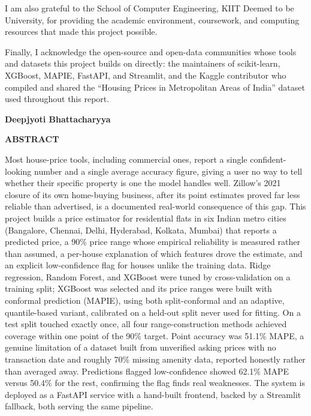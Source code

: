 \documentclass[12pt]{report}
\begin{document}
I am also grateful to the School of Computer Engineering, KIIT Deemed to be
University, for providing the academic environment, coursework, and computing
resources that made this project possible.

Finally, I acknowledge the open-source and open-data communities whose tools
and datasets this project builds on directly: the maintainers of scikit-learn,
XGBoost, MAPIE, FastAPI, and Streamlit, and the Kaggle contributor who
compiled and shared the ``Housing Prices in Metropolitan Areas of India''
dataset used throughout this report.

\vspace{2cm}
\noindent
\textbf{Deepjyoti Bhattacharyya}

\newpage
\thispagestyle{fancy}
\begin{center}
{\large \textbf{ABSTRACT}}
\end{center}
\vspace{0.6cm}

Most house-price tools, including commercial ones, report a single confident-looking
number and a single average accuracy figure, giving a user no way to tell whether
their specific property is one the model handles well. Zillow's 2021 closure of its
own home-buying business, after its point estimates proved far less reliable than
advertised, is a documented real-world consequence of this gap. This project builds a
price estimator for residential flats in six Indian metro cities (Bangalore, Chennai,
Delhi, Hyderabad, Kolkata, Mumbai) that reports a predicted price, a 90\% price range
whose empirical reliability is measured rather than assumed, a per-house explanation
of which features drove the estimate, and an explicit low-confidence flag for houses
unlike the training data. Ridge regression, Random Forest, and XGBoost were tuned by
cross-validation on a training split; XGBoost was selected and its price ranges were
built with conformal prediction (MAPIE), using both split-conformal and an adaptive,
quantile-based variant, calibrated on a held-out split never used for fitting. On a
test split touched exactly once, all four range-construction methods achieved
coverage within one point of the 90\% target. Point accuracy was 51.1\% MAPE, a
genuine limitation of a dataset built from unverified asking prices with no
transaction date and roughly 70\% missing amenity data, reported honestly rather than
averaged away. Predictions flagged low-confidence showed 62.1\% MAPE versus
50.4\% for the rest, confirming the flag finds real weaknesses. The system is
deployed as a FastAPI service with a hand-built frontend, backed by a Streamlit
fallback, both serving the same pipeline.
\end{document}
